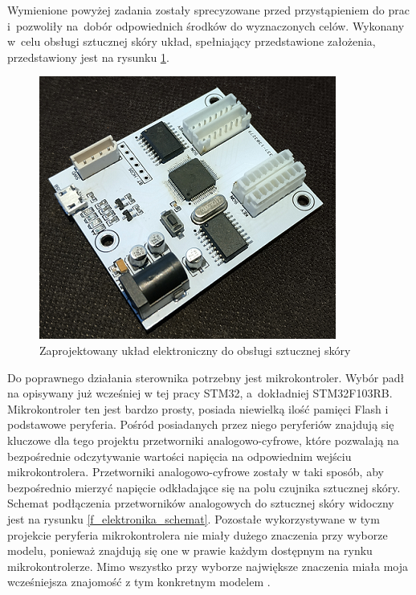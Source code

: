 Wymienione powyżej zadania zostały sprecyzowane przed przystąpieniem do prac i~pozwoliły na~dobór odpowiednich środków do wyznaczonych celów. Wykonany w~celu obsługi sztucznej skóry układ, spełniający przedstawione założenia, przedstawiony jest na rysunku \ref{f_elektronika_moja}.

\begin{figure}[!h]
    \centering 
    \includegraphics[width=0.5\linewidth]{img/elektronika_moja.png}
    \caption{Zaprojektowany układ elektroniczny do obsługi sztucznej skóry}
    \label{f_elektronika_moja}
\end{figure}

Do poprawnego działania sterownika potrzebny jest mikrokontroler. Wybór padł na opisywany już wcześniej w tej pracy STM32, a~dokładniej STM32F103RB. Mikrokontroler ten jest bardzo prosty, posiada niewielką ilość pamięci Flash i podstawowe peryferia. Pośród posiadanych przez niego peryferiów znajdują się kluczowe dla tego projektu przetworniki analogowo-cyfrowe, które pozwalają na bezpośrednie odczytywanie wartości napięcia na odpowiednim wejściu mikrokontrolera. Przetworniki analogowo-cyfrowe zostały w taki sposób, aby bezpośrednio mierzyć napięcie odkładające się na polu czujnika sztucznej skóry. Schemat podłączenia przetworników analogowych do sztucznej skóry widoczny jest na rysunku \ref{f_elektronika_schemat}. Pozostałe wykorzystywane w tym projekcie peryferia mikrokontrolera nie miały dużego znaczenia przy wyborze modelu, ponieważ znajdują się one w prawie każdym dostępnym na rynku mikrokontrolerze. Mimo wszystko przy wyborze największe znaczenia miała moja wcześniejsza znajomość z tym konkretnym modelem \cite{b_site_F103RB}.

